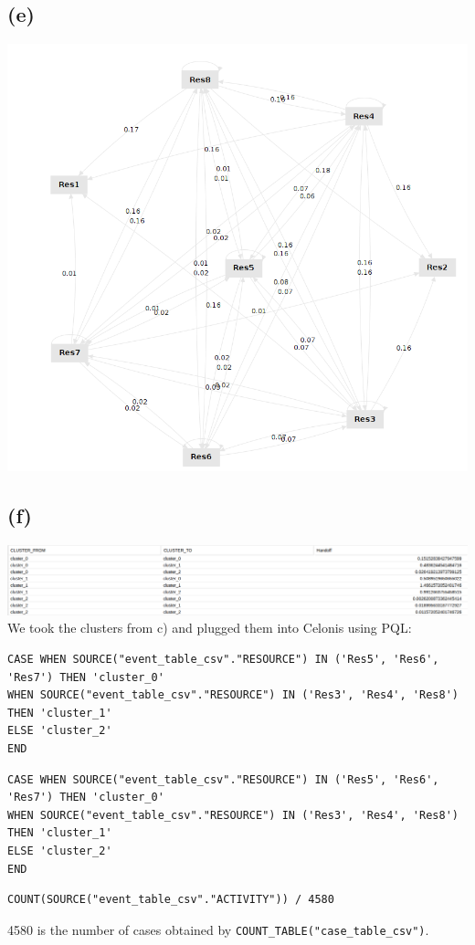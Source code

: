 \documentclass[../../main.tex]{subfiles}
\begin{document}
\subsection*{(e)}
\includegraphics[width=\columnwidth]{img/RapidMiner_e_Graph.png}

\subsection*{(f)}
\includegraphics[width=\columnwidth]{img/Celonis_f_OLAP.png}\\
We took the clusters from c) and plugged them into Celonis using PQL:
\begin{lstlisting}
CASE WHEN SOURCE("event_table_csv"."RESOURCE") IN ('Res5', 'Res6', 'Res7') THEN 'cluster_0'
WHEN SOURCE("event_table_csv"."RESOURCE") IN ('Res3', 'Res4', 'Res8') THEN 'cluster_1'
ELSE 'cluster_2'
END
\end{lstlisting}
\begin{lstlisting}
CASE WHEN SOURCE("event_table_csv"."RESOURCE") IN ('Res5', 'Res6', 'Res7') THEN 'cluster_0'
WHEN SOURCE("event_table_csv"."RESOURCE") IN ('Res3', 'Res4', 'Res8') THEN 'cluster_1'
ELSE 'cluster_2'
END
\end{lstlisting}
\begin{lstlisting}
COUNT(SOURCE("event_table_csv"."ACTIVITY")) / 4580
\end{lstlisting}
4580 is the number of cases obtained by \verb|COUNT_TABLE("case_table_csv")|.
\end{document}
